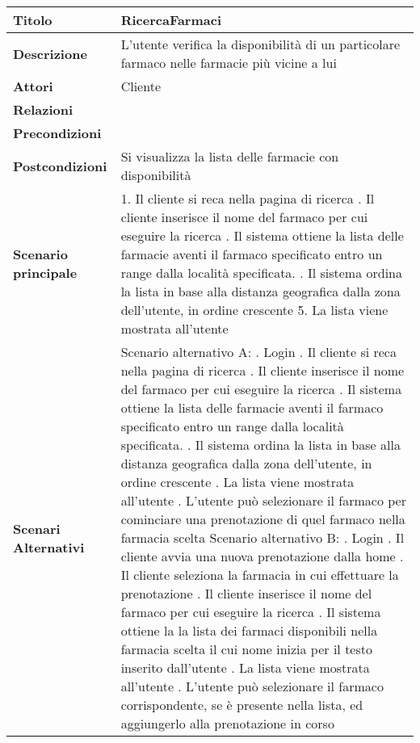\begin{tabular} {|P{4.5cm}|P{12.5cm}|}
  \hline
    \textbf{Titolo} & RicercaFarmaci\\
  \hline
    \textbf{Descrizione} & L'utente verifica la disponibilità di un particolare farmaco nelle farmacie più vicine a lui\\
  \hline
    \textbf{Attori} & Cliente\\
  \hline
    \textbf{Relazioni} &\\
  \hline
    \textbf{Precondizioni} &\\
  \hline
    \textbf{Postcondizioni} & Si visualizza la lista delle farmacie con disponibilità\\
  \hline
    \textbf{Scenario principale} & 1. Il cliente si reca nella pagina di ricerca . Il cliente inserisce il nome del farmaco per cui eseguire la ricerca . Il sistema ottiene la lista delle farmacie aventi il farmaco specificato entro un range dalla località specificata. . Il sistema ordina la lista in base alla distanza geografica dalla zona dell'utente, in ordine crescente 5. La lista viene mostrata all'utente\\
  \hline
    \textbf{Scenari Alternativi} &
      Scenario alternativo A: . Login . Il cliente si reca nella pagina di ricerca . Il cliente inserisce il nome del farmaco per cui eseguire la ricerca . Il sistema ottiene la lista delle farmacie aventi il farmaco specificato entro un range dalla località specificata. . Il sistema ordina la lista in base alla distanza geografica dalla zona dell'utente, in ordine crescente . La lista viene mostrata all'utente . L'utente può selezionare il farmaco per cominciare una prenotazione di quel farmaco nella farmacia scelta \linebreak
      Scenario alternativo B: . Login . Il cliente avvia una nuova prenotazione dalla home . Il cliente seleziona la farmacia in cui effettuare la prenotazione . Il cliente inserisce il nome del farmaco per cui eseguire la ricerca . Il sistema ottiene la la lista dei farmaci disponibili nella farmacia scelta il cui nome inizia per il testo inserito dall'utente . La lista viene mostrata all'utente . L'utente può selezionare il farmaco corrispondente, se è presente nella lista, ed aggiungerlo alla prenotazione in corso\\

\end{tabular}
